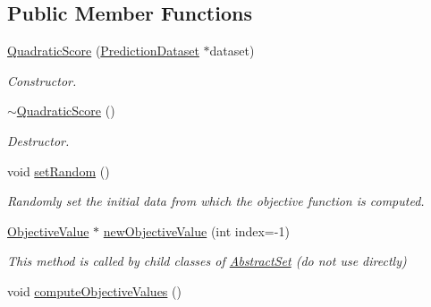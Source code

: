 \subsection*{Public Member Functions}
\begin{DoxyCompactItemize}
\item 
\hyperlink{classQuadraticScore_ae3c806c1c92d908975e2946559dae71e}{Quadratic\-Score} (\hyperlink{classPredictionDataset}{Prediction\-Dataset} $\ast$dataset)
\begin{DoxyCompactList}\small\item\em Constructor. \end{DoxyCompactList}\item 
\hypertarget{classQuadraticScore_af76ec32d4ad9923c7f5b0b31abcd2fbb}{\hyperlink{classQuadraticScore_af76ec32d4ad9923c7f5b0b31abcd2fbb}{$\sim$\-Quadratic\-Score} ()}\label{classQuadraticScore_af76ec32d4ad9923c7f5b0b31abcd2fbb}

\begin{DoxyCompactList}\small\item\em Destructor. \end{DoxyCompactList}\item 
\hypertarget{classQuadraticScore_a949e5c16a84d44a48a36fc4f32aa31c3}{void \hyperlink{classQuadraticScore_a949e5c16a84d44a48a36fc4f32aa31c3}{set\-Random} ()}\label{classQuadraticScore_a949e5c16a84d44a48a36fc4f32aa31c3}

\begin{DoxyCompactList}\small\item\em Randomly set the initial data from which the objective function is computed. \end{DoxyCompactList}\item 
\hypertarget{classQuadraticScore_a175321640c2eb17b264d91b91e7fd70e}{\hyperlink{classObjectiveValue}{Objective\-Value} $\ast$ \hyperlink{classQuadraticScore_a175321640c2eb17b264d91b91e7fd70e}{new\-Objective\-Value} (int index=-\/1)}\label{classQuadraticScore_a175321640c2eb17b264d91b91e7fd70e}

\begin{DoxyCompactList}\small\item\em This method is called by child classes of \hyperlink{classAbstractSet}{Abstract\-Set} (do not use directly) \end{DoxyCompactList}\item 
\hypertarget{classQuadraticScore_a669920b5c4612bd70dc830a8fa82ea71}{void \hyperlink{classQuadraticScore_a669920b5c4612bd70dc830a8fa82ea71}{compute\-Objective\-Values} ()}\label{classQuadraticScore_a669920b5c4612bd70dc830a8fa82ea71}


\end{DoxyCompactItemize}
